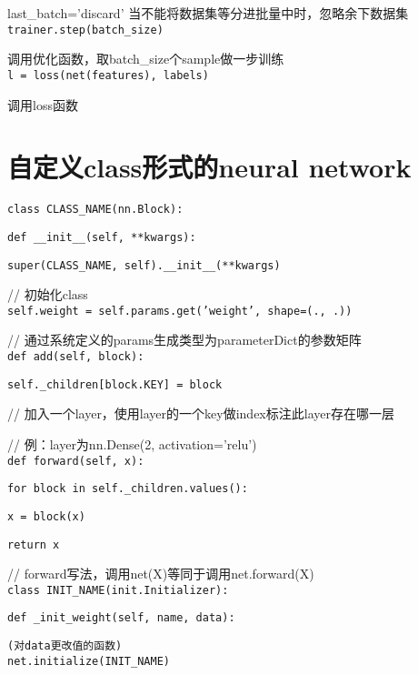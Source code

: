 \documentclass[UTF8]{ctexart}
\begin{document}
  last\_batch='discard' 当不能将数据集等分进批量中时，忽略余下数据集\\
\texttt{trainer.step(batch\_size)}

  调用优化函数，取batch\_size个sample做一步训练\\
\texttt{l = loss(net(features), labels)}

  调用loss函数

\section{自定义class形式的neural network}
\noindent \texttt{class CLASS\_NAME(nn.Block):}

  \texttt{def \_\_init\_\_(self, **kwargs):}

  \quad \texttt{super(CLASS\_NAME, self).\_\_init\_\_(**kwargs)}

  // 初始化class\\

  \quad \texttt{self.weight = self.params.get('weight', shape=(., .))}

  // 通过系统定义的params生成类型为parameterDict的参数矩阵\\

  \texttt{def add(self, block):}

  \quad \texttt{self.\_children[block.KEY] = block}

  // 加入一个layer，使用layer的一个key做index标注此layer存在哪一层

  // 例：layer为nn.Dense(2, activation='relu')\\

  \texttt{def forward(self, x):}

  \quad \texttt{for block in self.\_children.values():}

  \quad \quad \texttt{x = block(x)}

  \quad \quad \texttt{return x}

  // forward写法，调用net(X)等同于调用net.forward(X)\\
\texttt{class INIT\_NAME(init.Initializer):}

  \texttt{def \_init\_weight(self, name, data):}

  \quad \texttt{(对data更改值的函数)}\\
\texttt{net.initialize(INIT\_NAME)}
\end{document}
